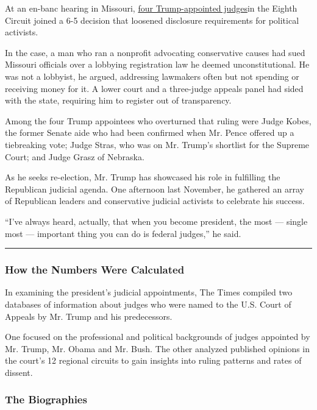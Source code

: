 At an en-banc hearing in Missouri,
\href{https://ecf.ca8.uscourts.gov/opndir/19/11/172654P.pdf}{four
Trump-appointed judges}in the Eighth Circuit joined a 6-5 decision that
loosened disclosure requirements for political activists.

In the case, a man who ran a nonprofit advocating conservative causes
had sued Missouri officials over a lobbying registration law he deemed
unconstitutional. He was not a lobbyist, he argued, addressing lawmakers
often but not spending or receiving money for it. A lower court and a
three-judge appeals panel had sided with the state, requiring him to
register out of transparency.

Among the four Trump appointees who overturned that ruling were Judge
Kobes, the former Senate aide who had been confirmed when Mr. Pence
offered up a tiebreaking vote; Judge Stras, who was on Mr. Trump's
shortlist for the Supreme Court; and Judge Grasz of Nebraska.

As he seeks re-election, Mr. Trump has showcased his role in fulfilling
the Republican judicial agenda. One afternoon last November, he gathered
an array of Republican leaders and conservative judicial activists to
celebrate his success.

``I've always heard, actually, that when you become president, the most
--- single most --- important thing you can do is federal judges,'' he
said.

\begin{center}\rule{0.5\linewidth}{\linethickness}\end{center}

\hypertarget{how-the-numbers-were-calculated}{%
\subsubsection{How the Numbers Were
Calculated}\label{how-the-numbers-were-calculated}}

In examining the president's judicial appointments, The Times compiled
two databases of information about judges who were named to the U.S.
Court of Appeals by Mr. Trump and his predecessors.

One focused on the professional and political backgrounds of judges
appointed by Mr. Trump, Mr. Obama and Mr. Bush. The other analyzed
published opinions in the court's 12 regional circuits to gain insights
into ruling patterns and rates of dissent.

\hypertarget{the-biographies}{%
\subsubsection{The Biographies}\label{the-biographies}}


